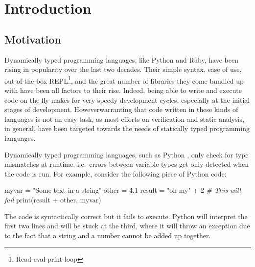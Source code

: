 \documentclass[
11pt, %
english, %
singlespacing, %
headsepline, %
]{MastersDoctoralThesis} %
\newenvironment{Shaded}{}{}
\newcommand{\BuiltInTok}[1]{#1}
\newcommand{\CommentTok}[1]{\textcolor[rgb]{0.38,0.63,0.69}{\textit{#1}}}
\newcommand{\DecValTok}[1]{\textcolor[rgb]{0.25,0.63,0.44}{#1}}
\newcommand{\FloatTok}[1]{\textcolor[rgb]{0.25,0.63,0.44}{#1}}
\newcommand{\NormalTok}[1]{#1}
\newcommand{\OperatorTok}[1]{\textcolor[rgb]{0.40,0.40,0.40}{#1}}
\newcommand{\StringTok}[1]{\textcolor[rgb]{0.25,0.44,0.63}{#1}}
\begin{document}
\hypertarget{introduction}{%
\chapter{Introduction}\label{introduction}}

\hypertarget{motivation}{%
\section{Motivation}\label{motivation}}

Dynamically typed programming languages, like Python and Ruby, have been
rising in popularity over the last two decades. Their simple syntax,
ease of use, out-of-the-box REPL\footnote{Read-eval-print loop}, and the
great number of libraries they come bundled up with have been all
factors to their rise. Indeed, being able to write and execute code on
the fly makes for very speedy development cycles, especially at the
initial stages of development. Howeverwarranting that code written in
these kinds of languages is not an easy task, as most efforts on
verification and static analysis, in general, have been targeted towards
the needs of statically typed programming languages.

Dynamically typed programming languages, such as Python
\autocite{van2007python}, only check for type mismatches at runtime,
i.e.~errors between variable types get only detected when the code is
run. For example, consider the following piece of Python code:

\begin{Shaded}
\begin{Highlighting}[]
\NormalTok{myvar }\OperatorTok{=} \StringTok{"Some text in a string"}
\NormalTok{other }\OperatorTok{=} \FloatTok{4.1}
\NormalTok{result }\OperatorTok{=} \StringTok{"oh my"} \OperatorTok{+} \DecValTok{2}  \CommentTok{# This will fail}
\BuiltInTok{print}\NormalTok{(result }\OperatorTok{+}\NormalTok{ other, myvar)}
\end{Highlighting}
\end{Shaded}

The code is syntactically correct but it fails to execute. Python will
interpret the first two lines and will be stuck at the third, where it
will throw an exception due to the fact that a string and a number
cannot be added up together.
\end{document}

